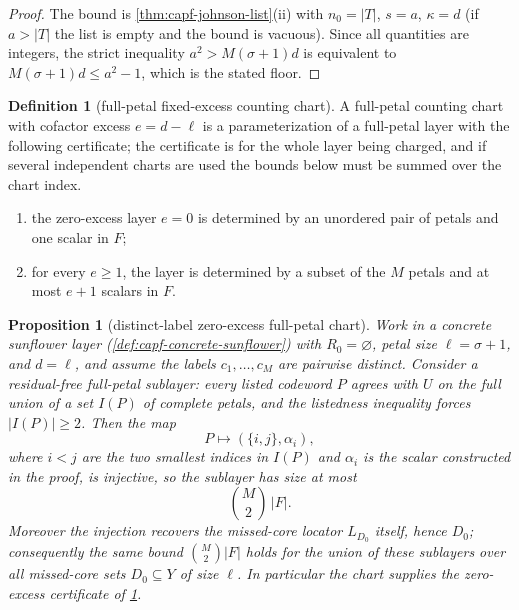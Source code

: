 \documentclass[11pt]{article}
\newtheorem{proposition}[proposition]{Proposition}
\theoremstyle{definition}
\newtheorem{definition}[definition]{Definition}
\theoremstyle{remark}
\begin{document}
\begin{proof}
The bound is \cref{thm:capf-johnson-list}\textup{(ii)} with $n_0=|T|$, $s=a$, $\kappa=d$ \textup{(if $a>|T|$ the list is empty and the bound is vacuous)}.  Since all quantities are integers, the strict inequality $a^2>M(\sigma+1)d$ is equivalent to $M(\sigma+1)d\le a^2-1$, which is the stated floor.
\end{proof}

\begin{definition}[full-petal fixed-excess counting chart]\label{def:capf-full-petal-chart}
A full-petal counting chart with cofactor excess $e=d-\ell$ is a parameterization of a full-petal layer with the following certificate; the certificate is for the whole layer being charged, and if several independent charts are used the bounds below must be summed over the chart index.
\begin{enumerate}[label=\textup{(\roman*)}]
\item the zero-excess layer $e=0$ is determined by an unordered pair of petals and one scalar in $F$;
\item for every $e\ge1$, the layer is determined by a subset of the $M$ petals and at most $e+1$ scalars in $F$.
\end{enumerate}
\end{definition}

\begin{proposition}[distinct-label zero-excess full-petal chart]\label{prop:capf-zero-excess-chart}
Work in a concrete sunflower layer \textup{(\cref{def:capf-concrete-sunflower})} with $R_0=\varnothing$, petal size $\ell=\sigma+1$, and $d=\ell$, and assume the labels $c_1,\ldots,c_M$ are pairwise distinct.  Consider a residual-free full-petal sublayer: every listed codeword $P$ agrees with $U$ on the full union of a set $I(P)$ of complete petals, and the listedness inequality forces $|I(P)|\ge2$.  Then the map
\[
        P\longmapsto(\{i,j\},\alpha_i),
\]
where $i<j$ are the two smallest indices in $I(P)$ and $\alpha_i$ is the scalar constructed in the proof, is injective, so the sublayer has size at most
\[
        \binom M2\,|F| .
\]
Moreover the injection recovers the missed-core locator $L_{D_0}$ itself, hence $D_0$; consequently the same bound $\binom M2|F|$ holds for the \emph{union} of these sublayers over all missed-core sets $D_0\subseteq Y$ of size $\ell$.  In particular the chart supplies the zero-excess certificate of \cref{def:capf-full-petal-chart}.
\end{proposition}
\end{document}
